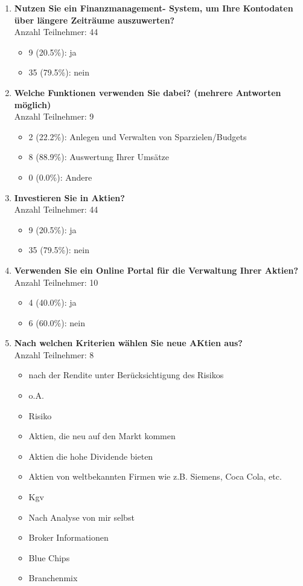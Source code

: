 \begin{enumerate}
    \item \textbf{Nutzen Sie ein Finanzmanagement- System, um Ihre Kontodaten über längere Zeiträume auszuwerten?} \\ Anzahl Teilnehmer: 44
    \begin{itemize}
        \item[] 9 (20.5\%): ja
        \item[] 35 (79.5\%): nein
    \end{itemize}
    
    \item \textbf{Welche Funktionen verwenden Sie dabei? (mehrere Antworten möglich)} \\ Anzahl Teilnehmer: 9
    \begin{itemize}
        \item[] 2 (22.2\%): Anlegen und Verwalten von Sparzielen/Budgets
        \item[] 8 (88.9\%): Auswertung Ihrer Umsätze
        \item[] 0 (0.0\%): Andere
    \end{itemize}
    
     \item \textbf{Investieren Sie in Aktien?} \\ Anzahl Teilnehmer: 44
    \begin{itemize}
        \item[] 9 (20.5\%): ja
        \item[] 35 (79.5\%): nein
    \end{itemize}
    
    \item \textbf{Verwenden Sie ein Online Portal für die Verwaltung Ihrer Aktien?} \\ Anzahl Teilnehmer: 10
    \begin{itemize}
        \item[] 4 (40.0\%): ja
        \item[] 6 (60.0\%): nein
    \end{itemize}
    
     \item \textbf{Nach welchen Kriterien wählen Sie neue AKtien aus?}\\ Anzahl Teilnehmer: 8
     \begin{itemize}
        \item nach der Rendite unter Berücksichtigung des Risikos
        \item o.A.
        \item Risiko
        \item Aktien, die neu auf den Markt kommen
        \item Aktien die hohe Dividende bieten
        \item Aktien von weltbekannten Firmen wie z.B. Siemens, Coca Cola, etc.
        \item Kgv
        \item Nach Analyse von mir selbst
        \item Broker Informationen
        \item Blue Chips
        \item Branchenmix
    \end{itemize}
    

\end{enumerate}
